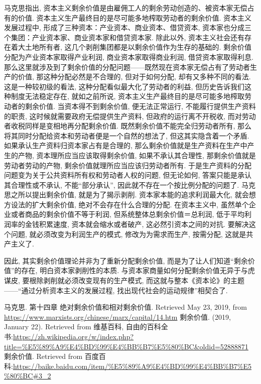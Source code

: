 \documentclass[UTF8,9pt]{ctexart}
\begin{document}
马克思指出, 资本主义剩余价值是由雇佣工人的剩余劳动创造的、被资本家无偿占有的价值. 资本主义生产最终目的是尽可能多地榨取劳动者的剩余价值. 资本主义发展过程中, 形成了三种资本：产业资本、商业资本、借贷资本, 资本家也分成三个集团：产业资本家、商业资本家和借贷资本家. 除此以外, 资本主义社会还有存在着大土地所有者, 这几个剥削集团都是以剩余价值作为生存的基础的. 剩余价值分配为产业资本家取得产业利润, 商业资本家取得商业利润, 借贷资本家取得利息\cite{2}. 那么这里就涉及到了剩余价值的分配问题------既然现在资本家无偿占有了劳动者生产的价值, 那这种分配必然是不合理的, 但对于如何分配, 却有又多种不同的看法.
    这是一种较初级的看法, 这种分配看似最大化了劳动者的利益, 但历史告诉我们这种制度无法稳定存在, 就如之前所说, 资本主义生产最终目的是尽可能多地榨取劳动者的剩余价值. 当资本得不到剩余价值, 便无法正常运行, 不能履行提供生产资料的职责, 这时候就需要政府无偿提供生产资料, 但政府的运行离不开税收, 而对劳动者收税同样是变相地再分配剩余价值. 
    既然剩余价值不能完全归劳动者所有, 那么将其同时分配给资本和劳动者便是一个自然的想法了, 但这其实隐含着一个矛盾. 如果承认生产资料归资本家占有是合理的, 那么剩余价值就是生产资料在生产中产生的产物, 资本理所应当应该取得剩余价值, 如果不承认其合理性, 那剩余价值就是劳动者劳动的产物, 剩余价值就理所应当应该归劳动者所有. 于是生产资料的分配问题变为关于公共资料所有权和劳动者人权的问题, 但无论如何, 答案只能是承认其合理性或不承认, 不能``部分承认'', 因此就不存在一个按比例分配的问题了. 
    马克思之所以提出剩余价值, 就是为了揭示剥削. 资本家本能的追求利润最大化, 就会想方设法的扩大剩余价值, 绝对不会存在什么合理的分配. 在资本主义中, 虽然单个企业或者商品的剩余价值不等于利润, 但系统整体总剩余价值＝总利润, 低于平均利润率的金钱积累速度, 资本就会缩水或者破产, 这必然引资本之间的对抗. 要解决这个问题, 就必须改变为利润生产的模式, 修改为为需求而生产, 按需分配, 这就是共产主义了. 


因此, 其实剩余价值理论并非为了重新分配剩余价值, 而是为了让人们知道``剩余价值''的存在, 明白资本家剥削性的本质. 与资本家商量如何分配剩余价值无异于与虎谋皮, 要根除剥削就必须改变现有的生产模式, 而这就与整本《资本论》的主题------“通过分析资本主义的发展过程, 找出现代社会的运动规律”相契合了. 
\begin{thebibliography}{99}  
    马克思. 第十四章 绝对剩余价值和相对剩余价值. Retrieved May 23, 2019, from \url{https://www.marxists.org/chinese/marx/capital/14.htm}
    剩余价值. (2019, January 22). Retrieved from 维基百科, 自由的百科全书:\url{https://zh.wikipedia.org/w/index.php?title=%E5%89%A9%E4%BD%99%E4%BB%B7%E5%80%BC&oldid=52888871}
    剩余价值. Retrieved from 百度百科:\url{https://baike.baidu.com/item/%E5%89%A9%E4%BD%99%E4%BB%B7%E5%80%BC#3_2}

\end{thebibliography}
\end{document}

